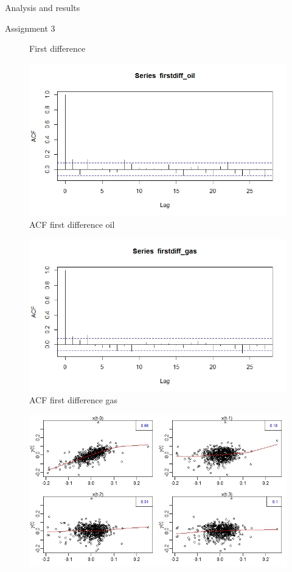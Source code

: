 \documentclass{article}
\begin{document}
\begin{section}{Analysis and results}
\begin{subsection}{Assignment 3}
\begin{figure}[ht!]
    \caption{First difference}
    \label{fig:oilandgasfirstdiff}
\end{figure}
\begin{figure}[ht!]
    \centering
    \includegraphics[scale=0.4]{oilfirstdiff_res}
    \caption{ACF first difference oil}
    \label{fig:oil_acf}
\end{figure}
\begin{figure}[ht!]
    \centering
    \includegraphics[scale=0.4]{gasfirstdiff_res}
    \caption{ACF first difference gas}
    \label{fig:gas_acf}
\end{figure}
\begin{figure}[ht!]
    \centering
    \includegraphics[scale=0.4]{oilandgaslag}

\end{figure}
\end{subsection}
\end{section}
\end{document}
